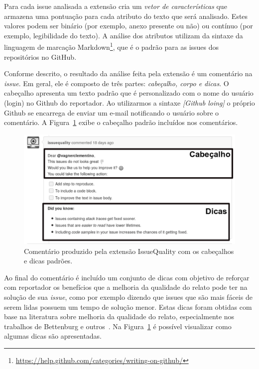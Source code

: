 Para cada issue analisada a extensão cria um \textit{vetor de características}
que armazena uma pontuação para cada atributo do texto que será analisado. Estes
valores podem ser binário (por exemplo, anexo presente ou não) ou contínuo (por
exemplo, legibilidade do texto). A análise dos atributos utilizam da sintaxe da
linguagem de marcação
Markdown\footnote{\url{https://help.github.com/categories/writing-on-github/}},
que é o padrão para as issues dos repositórios no GitHub.

Conforme descrito, o resultado da análise feita pela extensão é um comentário na
\textit{issue}. Em geral, ele é composto de três partes: \textit{cabeçalho,
    corpo e dicas}. O cabeçalho apresenta um texto padrão que é personalizado
com o nome do usuário (login) no Github do reportador. Ao utilizarmos a sintaxe
\textit{\@[Github loing]} o próprio Github se encarrega de enviar um e-mail
notificando o usuário sobre o comentário. A Figura~\ref{fig:issue_original}
exibe o cabeçalho padrão incluídos nos comentários.

\begin{figure}[htpb]
    \centering
    \includegraphics[width=0.8\linewidth]{chapter-implementacao-extensoes-fgrm/img/issue_original.png}
    \caption{Comentário produzido pela extensão IssueQuality com os cabeçalhos e
        dicas padrões.}
\label{fig:issue_original}
\end{figure}

Ao final do comentário é incluído um conjunto de dicas com objetivo de reforçar
com reportador os benefícios que a melhoria da qualidade do relato pode ter na
solução de sua \textit{issue}, como por exemplo dizendo que issues que são mais
fáceis de serem lidas possuem um tempo de solução menor. Estas dicas foram
obtidas com base na literatura sobre melhoria da qualidade do relato,
especialmente nos trabalhos de Bettenburg e outros~\cite{bettenburg2007quality,
    bettenburg2008makes}. Na Figura~\ref{fig:issue_original} é possível
visualizar como algumas dicas são apresentadas.

